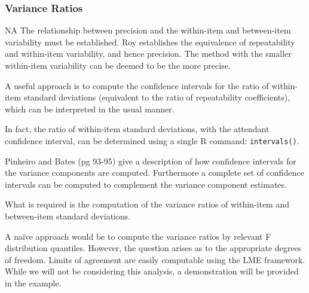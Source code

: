 \documentclass[12pt, a4paper]{report}
\theoremstyle{plain}
\theoremstyle{definition}
\theoremstyle{remark}
\begin{document}
	
	

	\subsubsection{Variance Ratios}
NA
	The relationship between precision and the within-item and between-item variability must be established. Roy establishes the equivalence of repeatability and within-item variability, and hence precision.  The method with the smaller within-item variability can be deemed to be the more precise.
	
	A useful approach is to compute the confidence intervals for the ratio of within-item standard deviations (equivalent to the ratio of repeatability coefficients), which can be interpreted in the usual manner.
	
	In fact, the ratio of within-item standard deviations, with the attendant confidence interval,  can be determined using a single R command: \texttt{intervals()}.
	
	Pinheiro and Bates (pg 93-95) give a description of how confidence intervals for the variance components are computed. Furthermore a complete set of confidence intervals can be computed to complement the variance component estimates.
	
	What is required is the computation of the variance ratios of within-item and between-item standard deviations.
	
	A naïve approach would be to compute the variance ratios by relevant F distribution quantiles. However, the question arises as to the appropriate degrees of freedom.
	Limits of agreement are easily computable using the LME framework. While we will not be considering this analysis, a demonstration will be provided in the example.
	
	
	
	
	
\end{document}
